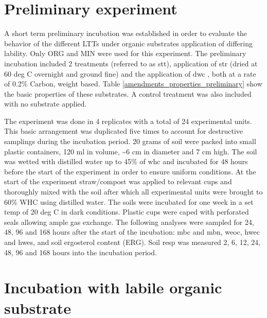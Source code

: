 \documentclass[12pt]{report}
\begin{document}
		
		
		
		
		\section{Preliminary experiment}
		
		A short term preliminary incubation was established in order to evaluate the behavior of the different LTTs under organic substrates application of differing lability.  Only ORG and MIN were used for this experiment.  The preliminary incubation included 2 treatments (referred to as \gls{stt}), application of \gls{str} (dried at 60 deg C overnight and ground fine) and the application of \gls{dwc} , both at a rate of 0.2\% Carbon, weight based. Table \ref{amendments_properties_preliminary} show the basic properties of these substrates. A control treatment was also included with no substrate applied.
		
		
		
		\noindent The experiment was done in 4 replicates with a total of 24 experimental units. This basic arrangement was duplicated five times to account for destructive samplings during the incubation period. 20 grams of soil were packed into small plastic containers, 120 ml in volume, \~{}6 cm in diameter and 7 cm high. The soil was wetted with distilled water up to 45\% of \gls{whc} and incubated for 48 hours before the start of the experiment in order to ensure uniform conditions. At the start of the experiment straw/compost was applied to relevant cups and thoroughly mixed with the soil after which all experimental units were brought to 60\% WHC using distilled water. The soils were incubated for one week in a set temp of 20 deg C in dark conditions. Plastic cups were caped with perforated seals allowing ample gas exchange. The following analyses were sampled for 24, 48, 96 and 168 hours after the start of the incubation: \gls{mbc} and \gls{mbn}, \gls{weoc}, \gls{hwec} and \gls{hwes},  and soil ergosterol content (ERG). Soil \gls{resp} was measured 2, 6, 12, 24, 48, 96 and 168 hours into the incubation period.
		
		
		\section{Incubation with labile organic substrate}
		
\end{document}
